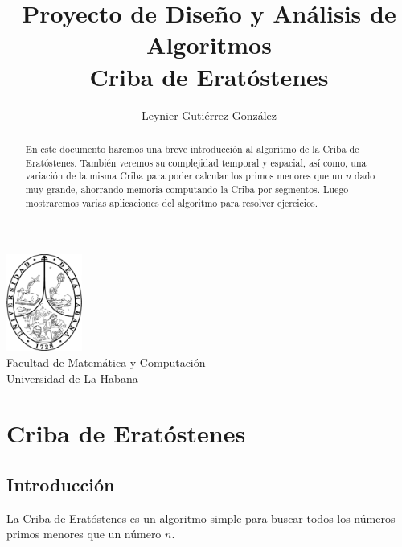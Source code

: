 \documentclass[12pt]{article}
\title{Proyecto de Diseño y Análisis de Algoritmos\\ \vspace{.2cm} \textbf{Criba de Eratóstenes}}
\author{Leynier Gutiérrez González}
\newcommand{\nl}{\vspace{0.3cm}}
\begin{document}
	
\maketitle

\vspace{0.5cm}

\begin{center}
	\vspace{0.2cm}
	\includegraphics[width=2.5cm]{images/escudo.png}\\
	\vspace{0.2cm}
	Facultad de Matemática y Computación\\
	\vspace{0.1cm}
	Universidad de La Habana\\
	\vspace{1cm}
\end{center}

\vspace{1cm}

\begin{abstract}
	En este documento haremos una breve introducción al algoritmo de la Criba de Eratóstenes. También veremos su complejidad temporal y espacial, así como, una variación de la misma Criba para poder calcular los primos menores que un $n$ dado muy grande, ahorrando memoria computando la Criba por segmentos. Luego mostraremos varias aplicaciones del algoritmo para resolver ejercicios.
\end{abstract}

\newpage

\tableofcontents

\newpage

\section{Criba de Eratóstenes}

\subsection{Introducción}

\nl

La Criba de Eratóstenes es un algoritmo simple para buscar todos los números primos menores que un número $n$.
\end{document}
